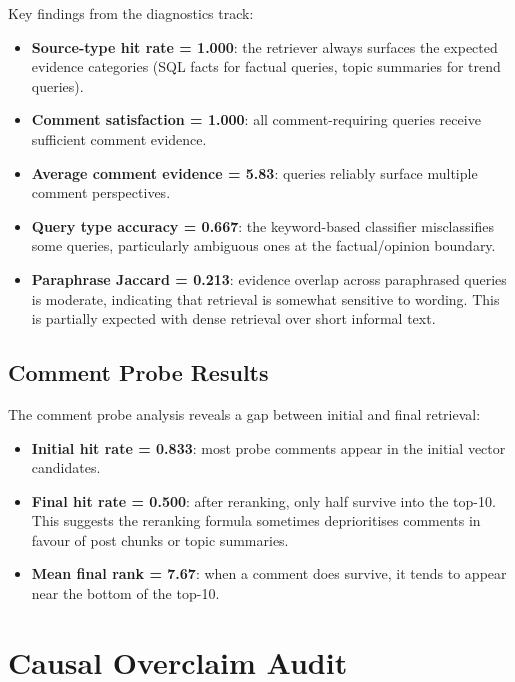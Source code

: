 \documentclass[11pt,a4paper]{article}
\begin{document}
Key findings from the diagnostics track:

\begin{itemize}[leftmargin=*]
  \item \textbf{Source-type hit rate = 1.000}: the retriever always surfaces the expected evidence categories (SQL facts for factual queries, topic summaries for trend queries).
  \item \textbf{Comment satisfaction = 1.000}: all comment-requiring queries receive sufficient comment evidence.
  \item \textbf{Average comment evidence = 5.83}: queries reliably surface multiple comment perspectives.
  \item \textbf{Query type accuracy = 0.667}: the keyword-based classifier misclassifies some queries, particularly ambiguous ones at the factual/opinion boundary.
  \item \textbf{Paraphrase Jaccard = 0.213}: evidence overlap across paraphrased queries is moderate, indicating that retrieval is somewhat sensitive to wording. This is partially expected with dense retrieval over short informal text.
\end{itemize}

\subsection{Comment Probe Results}

The comment probe analysis reveals a gap between initial and final retrieval:

\begin{itemize}[leftmargin=*]
  \item \textbf{Initial hit rate = 0.833}: most probe comments appear in the initial vector candidates.
  \item \textbf{Final hit rate = 0.500}: after reranking, only half survive into the top-10. This suggests the reranking formula sometimes deprioritises comments in favour of post chunks or topic summaries.
  \item \textbf{Mean final rank = 7.67}: when a comment does survive, it tends to appear near the bottom of the top-10.
\end{itemize}


\section{Causal Overclaim Audit}
\label{sec:causal}
\end{document}
